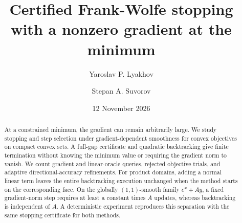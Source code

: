 \documentclass[a4paper,11pt]{article}
\title{Certified Frank-Wolfe stopping\\with a nonzero gradient at the minimum}
\author{Yaroslav P. Lyakhov \and Stepan A. Suvorov}
\date{12 November 2026}
\begin{document}
\maketitle
\begin{abstract}
At a constrained minimum, the gradient can remain arbitrarily large.
We study stopping and step selection under gradient-dependent
smoothness for convex objectives on compact convex sets. A full-gap
certificate and quadratic backtracking give finite termination without
knowing the minimum value or requiring the gradient norm to vanish.
We count gradient and linear-oracle queries, rejected objective trials,
and adaptive directional-accuracy refinements. For product domains,
adding a normal linear term leaves the entire backtracking execution
unchanged when the method starts on the corresponding face. On the
globally $(1,1)$-smooth family $e^x+Ay$, a fixed gradient-norm step requires
at least a constant times $A$ updates, whereas backtracking is independent
of $A$. A deterministic experiment reproduces this separation with the
same stopping certificate for both methods.
\end{abstract}






\end{document}
